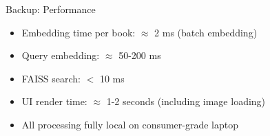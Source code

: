 \begin{frame}{Backup: Performance}

\begin{itemize}
    \item Embedding time per book: $\approx$ 2 ms (batch embedding)
    \item Query embedding: $\approx$ 50-200 ms
    \item FAISS search: $<$ 10 ms
    \item UI render time: $\approx$ 1-2 seconds (including image loading)
    \item All processing fully local on consumer-grade laptop
\end{itemize}

\end{frame}
